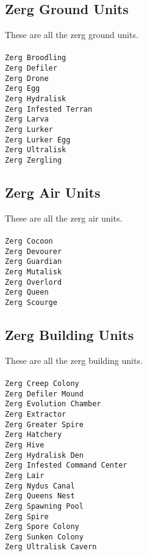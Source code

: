 \subsection{Zerg Ground Units}
These are all the zerg ground units.
\\\\
\verb|Zerg Broodling| \\
\verb|Zerg Defiler| \\
\verb|Zerg Drone| \\
\verb|Zerg Egg| \\
\verb|Zerg Hydralisk| \\
\verb|Zerg Infested Terran| \\
\verb|Zerg Larva| \\
\verb|Zerg Lurker| \\
\verb|Zerg Lurker Egg| \\
\verb|Zerg Ultralisk| \\
\verb|Zerg Zergling| \\

\subsection{Zerg Air Units}
These are all the zerg air units.
\\\\
\verb|Zerg Cocoon| \\
\verb|Zerg Devourer| \\
\verb|Zerg Guardian| \\
\verb|Zerg Mutalisk| \\
\verb|Zerg Overlord| \\
\verb|Zerg Queen| \\
\verb|Zerg Scourge| \\

\subsection{Zerg Building Units}
These are all the zerg building units.
\\\\
\verb|Zerg Creep Colony| \\
\verb|Zerg Defiler Mound| \\
\verb|Zerg Evolution Chamber| \\
\verb|Zerg Extractor| \\
\verb|Zerg Greater Spire| \\
\verb|Zerg Hatchery| \\
\verb|Zerg Hive| \\
\verb|Zerg Hydralisk Den| \\
\verb|Zerg Infested Command Center| \\
\verb|Zerg Lair| \\
\verb|Zerg Nydus Canal| \\
\verb|Zerg Queens Nest| \\
\verb|Zerg Spawning Pool| \\
\verb|Zerg Spire| \\
\verb|Zerg Spore Colony| \\
\verb|Zerg Sunken Colony| \\
\verb|Zerg Ultralisk Cavern| \\
